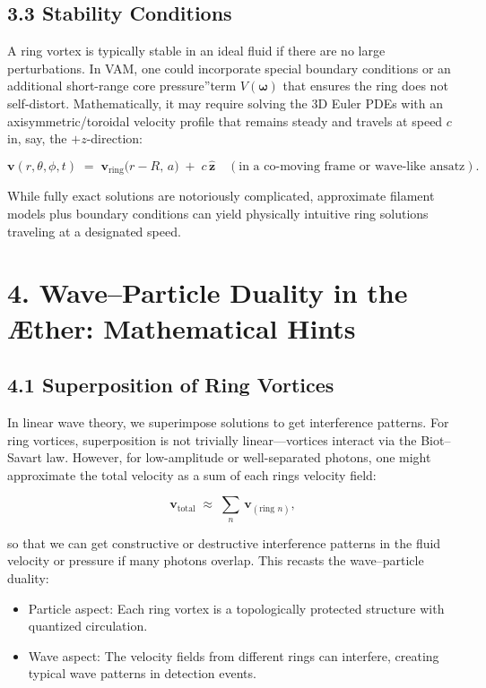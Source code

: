 \subsection*{3.3 Stability Conditions}
A ring vortex is typically stable in an ideal fluid if there are no large perturbations. In VAM, one could incorporate special boundary conditions or an additional short-range \grqq core pressure\textquotedblright term \(V(\boldsymbol{\omega})\) that ensures the ring does not self-distort. Mathematically, it may require solving the 3D Euler PDEs with an axisymmetric/toroidal velocity profile that remains steady and travels at speed \(c\) in, say, the \(+z\)-direction:

\[
 \mathbf{v}(r,\theta,\phi, t) \;=\; \mathbf{v}_\text{ring}\bigl(r - R,\,a\bigr) \;+\; c\,\hat{\mathbf{z}} \quad (\text{in a co-moving frame or wave-like ansatz}).
\]

While fully exact solutions are notoriously complicated, approximate filament models plus boundary conditions can yield physically intuitive ring solutions traveling at a designated speed.

\section*{4. Wave–Particle Duality in the Æther: Mathematical Hints}
\subsection*{4.1 Superposition of Ring Vortices}
In linear wave theory, we superimpose solutions to get interference patterns. For ring vortices, superposition is not trivially linear—vortices interact via the Biot–Savart law. However, for low-amplitude or well-separated photons, one might approximate the total velocity as a sum of each ring\rqs s velocity field:

\[
 \mathbf{v}_\text{total} \;\approx\; \sum_{n}\,\mathbf{v}_{(\text{ring } n)},
\]

so that we can get constructive or destructive interference patterns in the fluid velocity or pressure if many photons overlap. This recasts the wave–particle duality:

\begin{itemize}
 \item Particle aspect: Each ring vortex is a topologically protected structure with quantized circulation.
 \item Wave aspect: The velocity fields from different rings can interfere, creating typical wave patterns in detection events.
\end{itemize}

